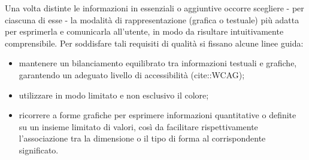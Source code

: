Una volta distinte le informazioni in essenziali o aggiuntive occorre scegliere - per ciascuna di esse - la modalità di rappresentazione (grafica o testuale) più adatta per esprimerla e comunicarla all'utente, in modo da risultare intuitivamente comprensibile. Per soddisfare tali requisiti di qualità si fissano alcune linee guida:
\begin{itemize}
  \item mantenere un bilanciamento equilibrato tra informazioni testuali e grafiche, garantendo un adeguato livello di accessibilità (cite::WCAG);
  \item utilizzare in modo limitato e non esclusivo il colore;
  \item ricorrere a forme grafiche per esprimere informazioni quantitative o definite su un insieme limitato di valori, così da facilitare rispettivamente l'associazione tra la dimensione o il tipo di forma al corrispondente significato.
\end{itemize}
 
